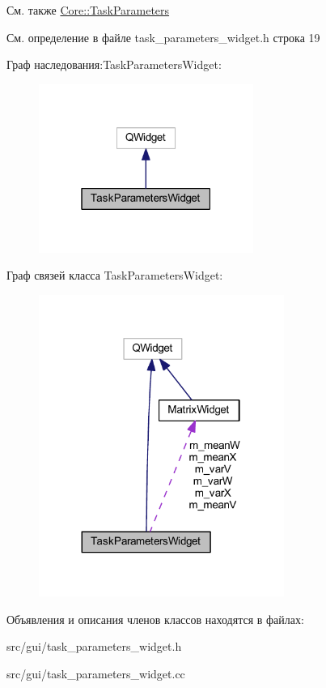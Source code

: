 \begin{DoxySeeAlso}{См. также}
\hyperlink{namespace_core_a34db09964ddb6b4af04cc94b02a49e29}{Core\+::\+Task\+Parameters} 
\end{DoxySeeAlso}


См. определение в файле task\+\_\+parameters\+\_\+widget.\+h строка 19



Граф наследования\+:Task\+Parameters\+Widget\+:
\nopagebreak
\begin{figure}[H]
\begin{center}
\leavevmode
\includegraphics[width=199pt]{class_task_parameters_widget__inherit__graph}
\end{center}
\end{figure}


Граф связей класса Task\+Parameters\+Widget\+:
\nopagebreak
\begin{figure}[H]
\begin{center}
\leavevmode
\includegraphics[width=227pt]{class_task_parameters_widget__coll__graph}
\end{center}
\end{figure}


Объявления и описания членов классов находятся в файлах\+:\begin{DoxyCompactItemize}
\item 
src/gui/task\+\_\+parameters\+\_\+widget.\+h\item 
src/gui/task\+\_\+parameters\+\_\+widget.\+cc\end{DoxyCompactItemize}

